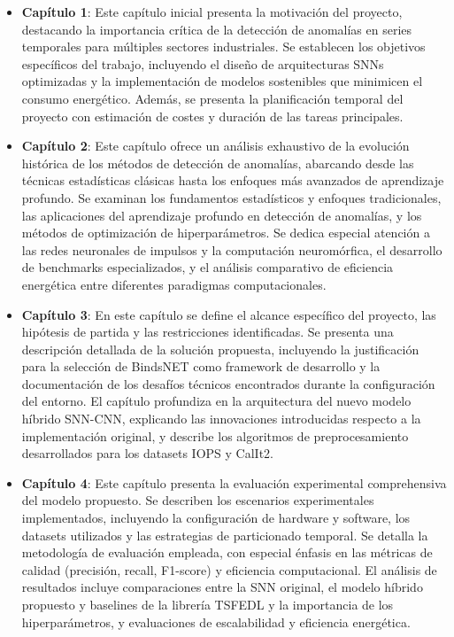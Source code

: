 \begin{itemize}
    \item\textbf{Capítulo 1}: Este capítulo inicial presenta la motivación del proyecto, destacando la importancia crítica de la detección de anomalías en series temporales para múltiples sectores industriales. Se establecen los objetivos específicos del trabajo, incluyendo el diseño de arquitecturas SNNs optimizadas y la implementación de modelos sostenibles que minimicen el consumo energético. Además, se presenta la planificación temporal del proyecto con estimación de costes y duración de las tareas principales.
    
    \item\textbf{Capítulo 2}: Este capítulo ofrece un análisis exhaustivo de la evolución histórica de los métodos de detección de anomalías, abarcando desde las técnicas estadísticas clásicas hasta los enfoques más avanzados de aprendizaje profundo. Se examinan los fundamentos estadísticos y enfoques tradicionales, las aplicaciones del aprendizaje profundo en detección de anomalías, y los métodos de optimización de hiperparámetros. Se dedica especial atención a las redes neuronales de impulsos y la computación neuromórfica, el desarrollo de benchmarks especializados, y el análisis comparativo de eficiencia energética entre diferentes paradigmas computacionales.
    
    \item\textbf{Capítulo 3}: En este capítulo se define el alcance específico del proyecto, las hipótesis de partida y las restricciones identificadas. Se presenta una descripción detallada de la solución propuesta, incluyendo la justificación para la selección de BindsNET como framework de desarrollo y la documentación de los desafíos técnicos encontrados durante la configuración del entorno. El capítulo profundiza en la arquitectura del nuevo modelo híbrido SNN-CNN, explicando las innovaciones introducidas respecto a la implementación original, y describe los algoritmos de preprocesamiento desarrollados para los datasets IOPS y CalIt2.
    
    \item\textbf{Capítulo 4}: Este capítulo presenta la evaluación experimental comprehensiva del modelo propuesto. Se describen los escenarios experimentales implementados, incluyendo la configuración de hardware y software, los datasets utilizados y las estrategias de particionado temporal. Se detalla la metodología de evaluación empleada, con especial énfasis en las métricas de calidad (precisión, recall, F1-score) y eficiencia computacional. El análisis de resultados incluye comparaciones entre la SNN original, el modelo híbrido propuesto y baselines de la librería TSFEDL y la importancia de los hiperparámetros, y evaluaciones de escalabilidad y eficiencia energética.
    

\end{itemize}
